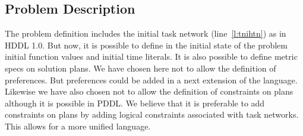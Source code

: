\documentclass[letterpaper]{article} %
\begin{document}


\subsection{Problem Description}

%
%
The problem definition includes the initial task network (line~\ref{l:tnihtn}) as in HDDL 1.0. But now, it is possible to define in the initial state of the problem initial function values and initial time literals. It is also possible to define metric specs on solution plans. We have chosen here not to allow the definition of preferences. But preferences could be added in a next extension of the language. Likewise we have also chosen not to allow the definition of constraints on plans although it is possible in PDDL. We believe that it is preferable to add constraints on plans by adding logical constraints associated with task networks. This allows for a more unified language.
\end{document}
